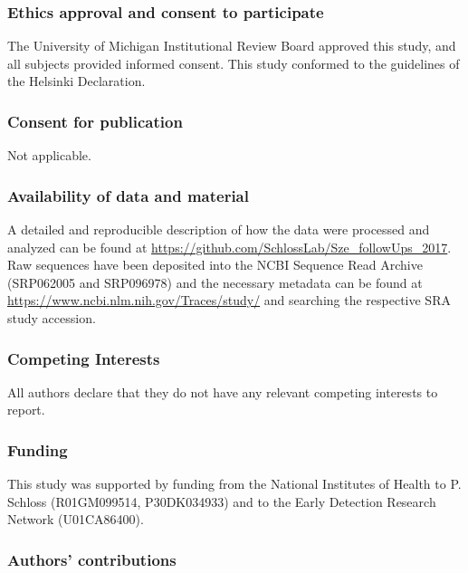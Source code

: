 \documentclass[12pt,]{article}
\begin{document}
\subsubsection{Ethics approval and consent to
participate}\label{ethics-approval-and-consent-to-participate}

The University of Michigan Institutional Review Board approved this
study, and all subjects provided informed consent. This study conformed
to the guidelines of the Helsinki Declaration.

\subsubsection{Consent for publication}\label{consent-for-publication}

Not applicable.

\subsubsection{Availability of data and
material}\label{availability-of-data-and-material}

A detailed and reproducible description of how the data were processed
and analyzed can be found at
\url{https://github.com/SchlossLab/Sze_followUps_2017}. Raw sequences
have been deposited into the NCBI Sequence Read Archive (SRP062005 and
SRP096978) and the necessary metadata can be found at
\url{https://www.ncbi.nlm.nih.gov/Traces/study/} and searching the
respective SRA study accession.

\subsubsection{Competing Interests}\label{competing-interests}

All authors declare that they do not have any relevant competing
interests to report.

\subsubsection{Funding}\label{funding}

This study was supported by funding from the National Institutes of
Health to P. Schloss (R01GM099514, P30DK034933) and to the Early
Detection Research Network (U01CA86400).

\subsubsection{Authors' contributions}\label{authors-contributions}
\end{document}
